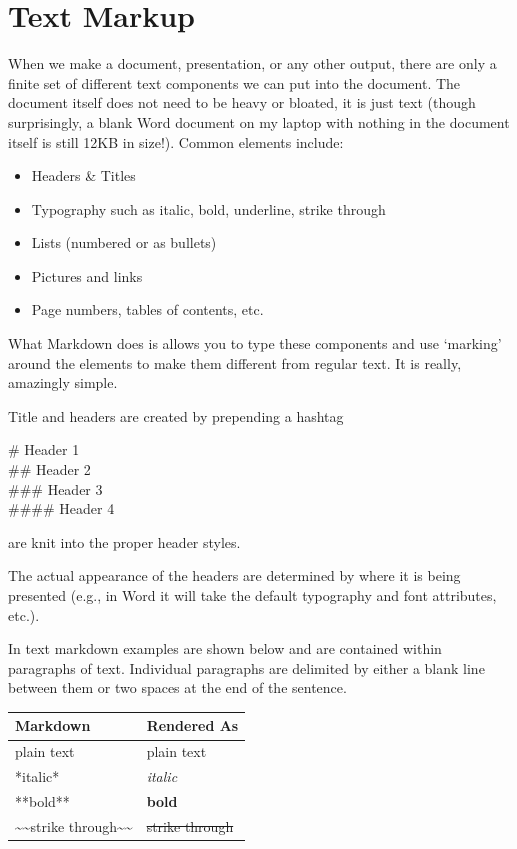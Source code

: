 \documentclass[
  letterpaper,
]{book}
\newcounter{none} %
\providecommand{\tightlist}{%
  \setlength{\itemsep}{0pt}\setlength{\parskip}{0pt}}
\begin{document}
\section{Text Markup}\label{text-markup}

When we make a document, presentation, or any other output, there are
only a finite set of different text components we can put into the
document. The document itself does not need to be heavy or bloated, it
is just text (though surprisingly, a blank Word document on my laptop
with nothing in the document itself is still 12KB in size!). Common
elements include:

\begin{itemize}
\tightlist
\item
  Headers \& Titles
\item
  Typography such as italic, bold, underline, strike through
\item
  Lists (numbered or as bullets)
\item
  Pictures and links
\item
  Page numbers, tables of contents, etc.
\end{itemize}

What Markdown does is allows you to type these components and use
`marking' around the elements to make them different from regular text.
It is really, amazingly simple.

Title and headers are created by prepending a hashtag

\# Header 1\\
\#\# Header 2\\
\#\#\# Header 3\\
\#\#\#\# Header 4

are knit into the proper header styles.

The actual appearance of the headers are determined by where it is being
presented (e.g., in Word it will take the default typography and font
attributes, etc.).

In text markdown examples are shown below and are contained within
paragraphs of text. Individual paragraphs are delimited by either a
blank line between them or two spaces at the end of the sentence.

{\def\LTcaptype{none} %
\begin{longtable}[]{@{}ll@{}}
\toprule\noalign{}
Markdown & Rendered As \\
\midrule\noalign{}
\endhead
\bottomrule\noalign{}
\endlastfoot
plain text & plain text \\
*italic* & \emph{italic} \\
**bold** & \textbf{bold} \\
\textasciitilde\textasciitilde strike
through\textasciitilde\textasciitilde{} & \st{strike through} \\
\end{longtable}
}
\end{document}
